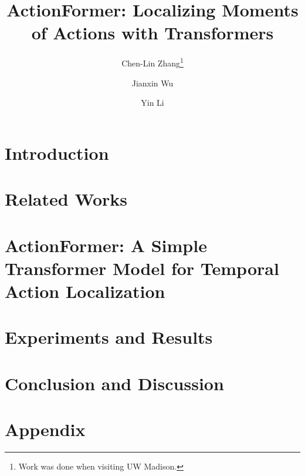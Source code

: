\documentclass[runningheads]{llncs}
\begin{document}
\pagestyle{headings}
\mainmatter
\def\ECCVSubNumber{7278}  %

\title{ActionFormer: Localizing Moments of Actions with Transformers} %



\author{{Chen-Lin Zhang\thanks{Work was done when visiting UW Madison.}} \and
Jianxin Wu \and
{Yin Li}}
\maketitle



\section{Introduction}
\label{sec:intro}


\section{Related Works}
\label{sec:related_work}


\section{ActionFormer: A Simple Transformer Model for Temporal Action Localization}
\label{sec:method}


\section{Experiments and Results}
\label{sec:exp}


\section{Conclusion and Discussion}


\section{Appendix}





\end{document}
